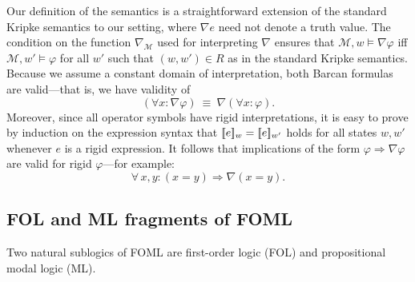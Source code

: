 \documentclass{easychair}
\renewcommand{\implies}{\Rightarrow}
\newcommand{\sem}[1]{\ensuremath{[\![ #1 ]\!]}}
\newcommand{\modal}{\nabla}
\newcommand{\MM}{\mathcal{M}}
\newcommand{\edmargin}[2]{\marginpar{\raggedright\footnotesize\color{red}#1: #2}}
\newcommand{\edmargin}[2]{}
\def\llmargin{\edmargin{LL}}
\let\notla\relax
\def\A{\forall\,}
\begin{document}
Our definition of the semantics is a straightforward extension of the standard
Kripke semantics to our setting, where $\modal e$ need not denote a truth value.
The condition on the function $\modal_{\MM}$ used for interpreting $\modal$
ensures that $\MM,w \models \modal \varphi$ iff $\MM,w' \models \varphi$ for all
$w'$ such that $(w,w') \in R$ as in the standard Kripke semantics.
Because we assume a constant domain of interpretation, both Barcan formulas are
valid---that is, we have validity of%
\begin{equation}\label{eq:barcan}
  (\forall x : \modal \varphi)\ \equiv\ \modal(\forall x: \varphi).
\end{equation}
%
Moreover, since all operator symbols have rigid interpretations, it is easy to
prove by induction on the expression syntax that $\notla\sem{e}_w =
\sem{e}_{w'}$ holds for all states $w,w'$ whenever $e$ is a rigid expression.
It follows that implications of the form
%
\(
  \varphi \implies \modal \varphi
\)
%
are valid for rigid $\varphi$---for example:
%
\begin{equation}\label{eq:rigid-box}
  \A x,y : (x=y) \implies \modal(x=y).
\end{equation}



\subsection{FOL and ML fragments of FOML}

Two natural sublogics of FOML are first-order logic (FOL) and propositional modal
logic (ML).
\end{document}
